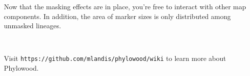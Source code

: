 \documentclass[11pt]{article}
\newcommand{\impmark}{\strut\vadjust{\domark}}
\newcommand{\domark}{%
  \vbox to 0pt{
    \kern-\dp\strutbox
    \smash{\llap{$\rightarrow$\kern1em}}
    \vss
  }%
}
\begin{document}
Now that the masking effects are in place, you're free to interact with other map components.
In addition, the area of marker sizes is only distributed among unmasked lineages.

\noindent \\ \impmark Visit \texttt{https://github.com/mlandis/phylowood/wiki} to learn more about Phylowood.


\end{document}
